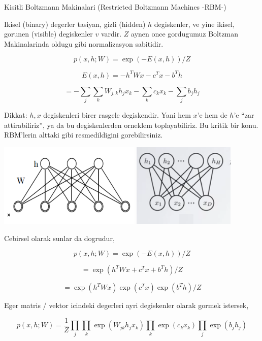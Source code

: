 \documentclass[12pt,fleqn]{article}\usepackage{../common}
\begin{document}
Kisitli Boltzmann Makinalari (Restricted Boltzmann Machines -RBM-)

Ikisel (binary) degerler tasiyan, gizli (hidden) $h$ degiskenler, ve yine
ikisel, gorunen (visible) degiskenler $v$ vardir. $Z$ aynen once gordugumuz
Boltzman Makinalarinda oldugu gibi normalizasyon sabitidir.

$$ p(x,h;W) = \exp (-E(x,h)) / Z $$

$$ E(x,h) = -h^TWx - c^Tx - b^Th $$

$$ = - \sum_j \sum_k W_{j,k}h_jx_k - \sum_k c_kx_k - \sum_j b_jh_j  $$

Dikkat: $h,x$ degiskenleri birer rasgele degiskendir. Yani hem $x$'e hem de
$h$'e ``zar attirabiliriz'', ya da bu degiskenlerden orneklem
toplayabiliriz. Bu kritik bir konu. RBM'lerin alttaki gibi resmedildigini
gorebilirsiniz.

\includegraphics[height=4cm]{rbm_01.png}
\includegraphics[height=4cm]{rbm_02.png}

Cebirsel olarak sunlar da dogrudur,

$$ p(x,h;W) = \exp (-E(x,h)) / Z $$

$$ = \exp (h^TWx + c^Tx + b^Th ) / Z $$

$$ = \exp (h^TWx) \exp (c^Tx) \exp(b^Th) / Z $$

Eger matris / vektor icindeki degerleri ayri degiskenler olarak gormek
istersek, 

$$ 
p(x,h;W) = \frac{1}{Z}
\prod_j \prod_k \exp (W_{jk}h_jx_k) \prod_k \exp(c_kx_k) \prod_j \exp(b_jh_j) 
 $$
\end{document}
